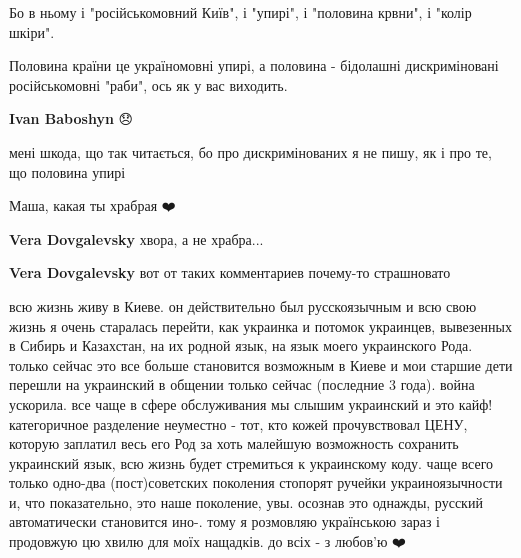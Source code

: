 \begin{itemize}
\begin{itemize}
Бо в ньому і "російськомовний Київ", і "упирі", і "половина крвни", і "колір
шкіри".

Половина країни це україномовні упирі, а половина - бідолашні дискриміновані
російськомовні "раби", ось як у вас виходить.


 
\textbf{Ivan Baboshyn} 😞 

мені шкода, що так читається, бо про дискримінованих я не пишу, як і про те, що
половина упирі

\end{itemize}

 
Маша, какая ты храбрая ❤️

\begin{itemize}
 
\textbf{Vera Dovgalevsky} хвора, а не храбра...

 
\textbf{Vera Dovgalevsky} вот от таких комментариев почему-то страшновато
\end{itemize}

 

всю жизнь живу в Киеве. он действительно был русскоязычным и всю свою жизнь я
очень старалась перейти, как украинка и потомок украинцев, вывезенных в Сибирь
и Казахстан, на их родной язык, на язык моего украинского Рода. только сейчас
это все больше становится возможным в Киеве и мои старшие дети перешли на
украинский в общении только сейчас (последние 3 года). война ускорила. все чаще
в сфере обслуживания мы слышим украинский и это кайф! категоричное разделение
неуместно - тот, кто кожей прочувствовал ЦЕНУ, которую заплатил весь его Род за
хоть малейшую возможность сохранить украинский язык, всю жизнь будет стремиться
к украинскому коду. чаще всего только одно-два (пост)советских поколения
стопорят ручейки украиноязычности и, что показательно, это наше поколение, увы.
осознав это однажды, русский автоматически становится ино-. тому я розмовляю
українською зараз і продовжую цю хвилю для моїх нащадків. до всіх - з любов'ю ❤️


\end{itemize}
